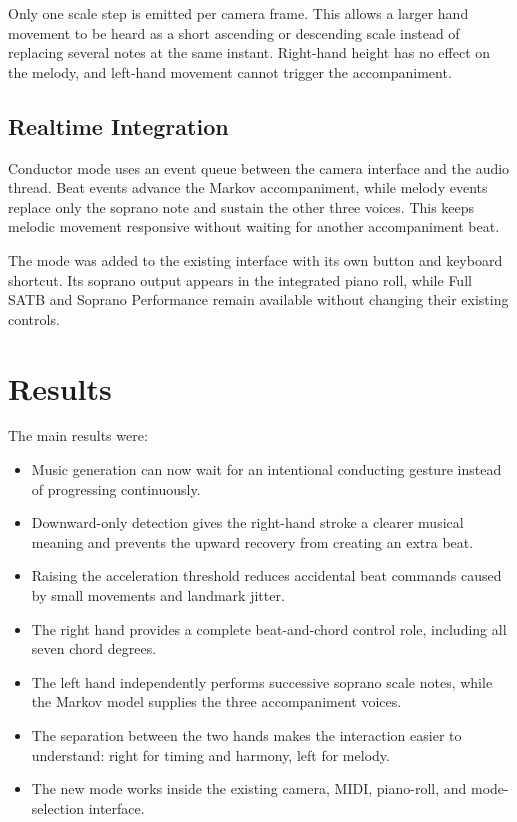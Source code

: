\documentclass[11pt,a4paper]{article}
\begin{document}
Only one scale step is emitted per camera frame. This allows a larger hand
movement to be heard as a short ascending or descending scale instead of
replacing several notes at the same instant. Right-hand height has no effect
on the melody, and left-hand movement cannot trigger the accompaniment.

\subsection{Realtime Integration}

Conductor mode uses an event queue between the camera interface and the audio
thread. Beat events advance the Markov accompaniment, while melody events
replace only the soprano note and sustain the other three voices. This keeps
melodic movement responsive without waiting for another accompaniment beat.

The mode was added to the existing interface with its own button and keyboard
shortcut. Its soprano output appears in the integrated piano roll, while Full
SATB and Soprano Performance remain available without changing their existing
controls.

\section{Results}

The main results were:

\begin{itemize}
    \item Music generation can now wait for an intentional conducting gesture
    instead of progressing continuously.
    \item Downward-only detection gives the right-hand stroke a clearer musical
    meaning and prevents the upward recovery from creating an extra beat.
    \item Raising the acceleration threshold reduces accidental beat commands
    caused by small movements and landmark jitter.
    \item The right hand provides a complete beat-and-chord control role,
    including all seven chord degrees.
    \item The left hand independently performs successive soprano scale notes,
    while the Markov model supplies the three accompaniment voices.
    \item The separation between the two hands makes the interaction easier to
    understand: right for timing and harmony, left for melody.
    \item The new mode works inside the existing camera, MIDI, piano-roll, and
    mode-selection interface.
\end{itemize}
\end{document}
